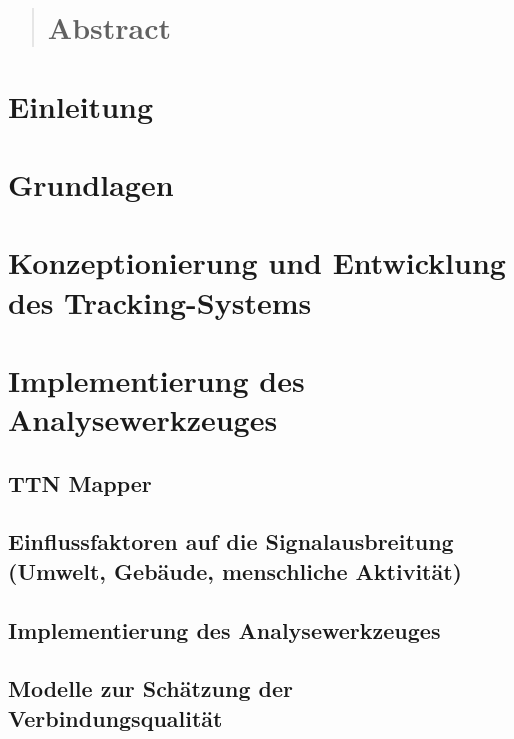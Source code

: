 \documentclass[
	a4paper,
	12pt,
	bibtotoc,
	listof=totoc,
	titlepage
]{scrartcl}
\begin{document}



\clearpage
\begin{abstract}
    \section{Abstract}
\end{abstract}

\clearpage
\tableofcontents

\clearpage
{}

\section{Einleitung}

\newpage

\section{Grundlagen}

\newpage

\section{Konzeptionierung und Entwicklung des Tracking-Systems}

\newpage

\section{Implementierung des Analysewerkzeuges}
\subsection{TTN Mapper}
\subsection{Einflussfaktoren auf die Signalausbreitung (Umwelt, Gebäude, menschliche Aktivität)}
\subsection{Implementierung des Analysewerkzeuges}
\subsection{Modelle zur Schätzung der Verbindungsqualität}
\end{document}
